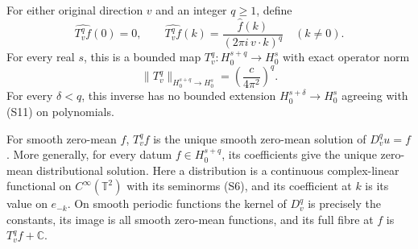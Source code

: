 \begin{theorem}
\label{thm:ns-sharp-smooth-inverse}
For either original direction $v$ and an integer $q\geq1$, define
\[
 \widehat{T_v^q f}(0)=0,\qquad
 \widehat{T_v^q f}(k)
       =\frac{\widehat f(k)}{(2\pi i\,v\cdot k)^q}\quad(k\ne0).
                                                               \tag{S11}
\]
For every real $s$, this is a bounded map
$T_v^q:H^{s+q}_0\to H^s_0$ with exact operator norm
\[
 \|T_v^q\|_{H^{s+q}_0\to H^s_0}
       =\left(\frac c{4\pi^2}\right)^q.              \tag{S12}
\]
For every $\delta<q$, this inverse has no bounded extension
$H^{s+\delta}_0\to H^s_0$ agreeing with (S11) on polynomials.

For smooth zero-mean $f$, $T_v^qf$ is the unique smooth zero-mean
solution of $D_v^q u=f$. More generally, for every datum
$f\in H^{s+q}_0$, its coefficients give the unique zero-mean
distributional solution. Here a distribution is a continuous
complex-linear functional on $C^\infty(\mathbb T^2)$ with its
seminorms (S6), and its coefficient at $k$ is its value on $e_{-k}$.
On smooth periodic
functions the kernel of $D_v^q$ is precisely the constants, its
image is all smooth zero-mean functions, and its full fibre at $f$
is $T_v^q f+\mathbb C$.
\end{theorem}
